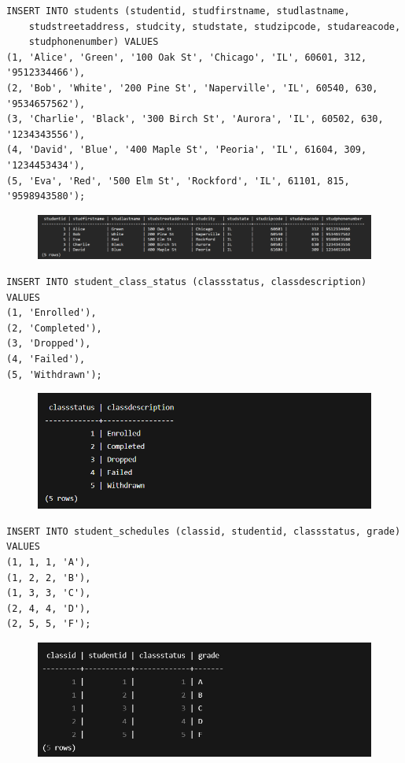 \documentclass{article}
\begin{document}
\begin{Verbatim}[frame=single,framerule=1pt,fontfamily=courier,fontsize=\small]
INSERT INTO students (studentid, studfirstname, studlastname, 
    studstreetaddress, studcity, studstate, studzipcode, studareacode, 
    studphonenumber) VALUES 
(1, 'Alice', 'Green', '100 Oak St', 'Chicago', 'IL', 60601, 312, '9512334466'),
(2, 'Bob', 'White', '200 Pine St', 'Naperville', 'IL', 60540, 630, '9534657562'),
(3, 'Charlie', 'Black', '300 Birch St', 'Aurora', 'IL', 60502, 630, '1234343556'),
(4, 'David', 'Blue', '400 Maple St', 'Peoria', 'IL', 61604, 309, '1234453434'),
(5, 'Eva', 'Red', '500 Elm St', 'Rockford', 'IL', 61101, 815, '9598943580');
\end{Verbatim}
\begin{figure}[H]
    \centering
    \includegraphics[width=\textwidth]{select/student.png}
\end{figure}

\begin{Verbatim}[frame=single,framerule=1pt,fontfamily=courier,fontsize=\small]
INSERT INTO student_class_status (classstatus, classdescription) VALUES 
(1, 'Enrolled'),
(2, 'Completed'),
(3, 'Dropped'),
(4, 'Failed'),
(5, 'Withdrawn');
\end{Verbatim}
\begin{figure}[H]
    \centering
    \includegraphics[width=\textwidth]{select/student_class_status.png}
\end{figure}

\begin{Verbatim}[frame=single,framerule=1pt,fontfamily=courier,fontsize=\small]
INSERT INTO student_schedules (classid, studentid, classstatus, grade) VALUES 
(1, 1, 1, 'A'),
(1, 2, 2, 'B'),
(1, 3, 3, 'C'),
(2, 4, 4, 'D'),
(2, 5, 5, 'F');
\end{Verbatim}
\begin{figure}[H]
    \centering
    \includegraphics[width=\textwidth]{select/student_schedules.png}
\end{figure}
\end{document}
